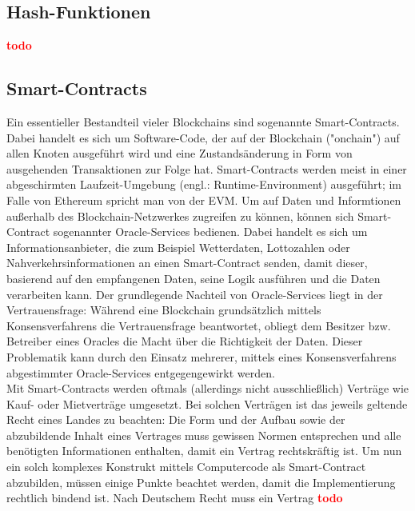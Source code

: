 \subsection{Hash-Funktionen}
\label{subsec:fundamentals:dlt:hashes}
\textbf{\textcolor{red}{todo}}



\subsection{Smart-Contracts}
\label{subsec:fundamentals:dlt:smartcontracts}
Ein essentieller Bestandteil vieler Blockchains sind sogenannte Smart-Contracts. Dabei handelt es sich um Software-Code, der auf der Blockchain ("onchain") auf allen Knoten ausgeführt wird und eine Zustandsänderung in Form von ausgehenden Transaktionen zur Folge hat. Smart-Contracts werden meist in einer abgeschirmten Laufzeit-Umgebung (engl.: Runtime-Environment) ausgeführt; im Falle von Ethereum spricht man von der \ac{EVM}. Um auf Daten und Informtionen außerhalb des Blockchain-Netzwerkes zugreifen zu können, können sich Smart-Contract sogenannter Oracle-Services bedienen. Dabei handelt es sich um Informationsanbieter, die zum Beispiel Wetterdaten, Lottozahlen oder Nahverkehrsinformationen an einen Smart-Contract senden, damit dieser, basierend auf den empfangenen Daten, seine Logik ausführen und die Daten verarbeiten kann. Der grundlegende Nachteil von Oracle-Services liegt in der Vertrauensfrage: Während eine Blockchain grundsätzlich mittels Konsensverfahrens die Vertrauensfrage beantwortet, obliegt dem Besitzer bzw. Betreiber eines Oracles die Macht über die Richtigkeit der Daten. Dieser Problematik kann durch den Einsatz mehrerer, mittels eines Konsensverfahrens abgestimmter Oracle-Services entgegengewirkt werden.\\
Mit Smart-Contracts werden oftmals (allerdings nicht ausschließlich) Verträge wie Kauf- oder Mietverträge umgesetzt. Bei solchen Verträgen ist das jeweils geltende Recht eines Landes zu beachten: Die Form und der Aufbau sowie der abzubildende Inhalt eines Vertrages muss gewissen Normen entsprechen und alle benötigten Informationen enthalten, damit ein Vertrag rechtskräftig ist. Um nun ein solch komplexes Konstrukt mittels Computercode als Smart-Contract abzubilden, müssen einige Punkte beachtet werden, damit die Implementierung rechtlich bindend ist. Nach Deutschem Recht muss ein Vertrag
\textbf{\textcolor{red}{todo}}

